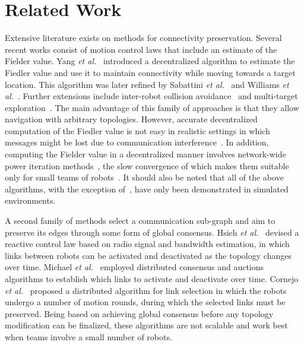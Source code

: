 \section{Related Work}
\label{sec:relatedwork}

Extensive literature exists on methods for connectivity
preservation. Several recent works consist of motion control laws that
include an estimate of the Fielder value. Yang \emph{et
  al.}~\cite{Yang2010} introduced a decentralized algorithm to
estimate the Fiedler value and use it to maintain connectivity while
moving towards a target location. This algorithm was later refined by
Sabattini \emph{et al.}~\cite{Sabattini2011} and Williams \emph{et
  al.}~\cite{Williams2013}. Further extensions include inter-robot
collision avoidance~\cite{RobuffoGiordano2013} and multi-target
exploration~\cite{Nestmeyer2017}. The main advantage of this family of
approaches is that they allow navigation with arbitrary
topologies. However, accurate decentralized computation of the Fiedler
value is not easy in realistic settings in which messages might be
lost due to communication interference~\cite{DiLorenzo2013}. In
addition, computing the Fielder value in a decentralized manner
involves network-wide power iteration methods~\cite{Bertrand2013},
the slow convergence of which makes them suitable only for small teams of
robots~\cite{Sahai2012,Williams2013}. It should also be noted that all
of the above algorithms, with the exception
of~\cite{RobuffoGiordano2013}, have only been demonstrated in
simulated environments.

A second family of methods select a communication sub-graph and aim to
preserve its edges through some form of global consensus. Hsieh
\emph{et al.}~\cite{Hsieh2008} devised a reactive control law based on
radio signal and bandwidth estimation, in which links between robots
can be activated and deactivated as the topology changes over
time. Michael \emph{et al.}~\cite{Michael2009} employed distributed
consensus and auctions algorithms to establish which links to activate
and deactivate over time. Cornejo \emph{et
  al.}~\cite{Cornejo2009,Cornejo2012} proposed a distributed algorithm
for link selection in which the robots undergo a number of motion
rounds, during which the selected links must be preserved. Being based
on achieving global consensus before any topology modification can be
finalized, these algorithms are not scalable and work best when teams
involve a small number of robots.

